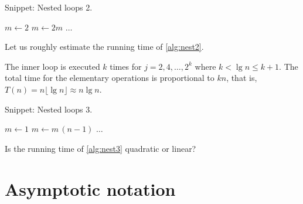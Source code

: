 
\begin{algorithm}[H]
  \caption{Snippet: Nested loops 2.}
  \label{alg:nest2}
\begin{algorithmic}[0]
\State $m \leftarrow 2$
		\State $m \leftarrow 2m$
			\State $\ldots$ 
		\EndFor
	\EndIf 
\EndFor
\end{algorithmic}
\end{algorithm}

\begin{Boxample}[6] \label{exm:nest2}
Let us roughly estimate the running time of \cref{alg:nest2}.

The inner loop is executed $k$ times for $j = 2, 4, \ldots, 2^{k}$
where $k < \lg n \le k + 1$. The total time for the elementary operations is 
proportional to $kn$, that is, $T(n) =  n  \lfloor \lg n \rfloor \approx n \lg n$.
\end{Boxample}


\begin{algorithm}[H]
  \caption{Snippet: Nested loops 3.}
  \label{alg:nest3}
\begin{algorithmic}[0]
\State $m \leftarrow 1$
		\State $m \leftarrow m \,(n - 1)$
			\State $\ldots$ 
		\EndFor
	\EndIf
\EndFor 
\end{algorithmic}
\end{algorithm}

\begin{Boxample}[6] \label{exm:nest1}
Is the running time of \cref{alg:nest3} quadratic or linear?
\end{Boxample}



\chapter{Asymptotic notation} %

